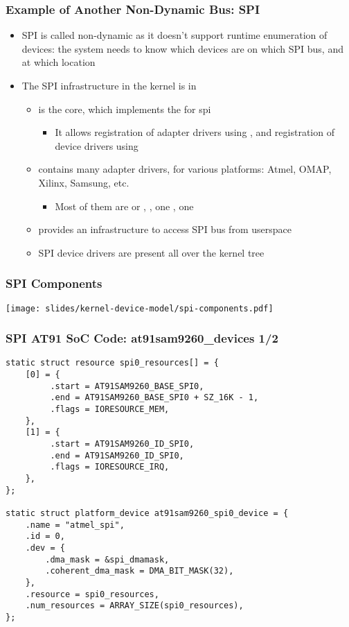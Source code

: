 \begin{frame}
  \frametitle{Example of Another Non-Dynamic Bus: SPI}
  \begin{itemize}
  \item SPI is called non-dynamic as it doesn't support runtime
    enumeration of devices: the system needs to know which devices are
    on which SPI bus, and at which location
  \item The SPI infrastructure in the kernel is in 
    \begin{itemize}
    \item {} is the core, which implements the
       for spi
      \begin{itemize}
      \item It allows registration of adapter drivers using
        , and registration of device
        drivers using 
      \end{itemize}
    \item {} contains many adapter drivers, for
      various platforms: Atmel, OMAP, Xilinx, Samsung, etc.
      \begin{itemize}
      \item Most of them are  or
        , , one
        , one 
      \end{itemize}
    \item {} provides an infrastructure to
      access SPI bus from userspace
    \item SPI device drivers are present all over the kernel tree
    \end{itemize}
  \end{itemize}
\end{frame}

\begin{frame}
  \frametitle{SPI Components}
  \begin{center}
    \texttt{[image: slides/kernel-device-model/spi-components.pdf]}
  \end{center}
\end{frame}

\begin{frame}[fragile]
  \frametitle{SPI AT91 SoC Code: at91sam9260\_devices 1/2}
  \begin{verbatim}
static struct resource spi0_resources[] = {
    [0] = {
         .start = AT91SAM9260_BASE_SPI0,
         .end = AT91SAM9260_BASE_SPI0 + SZ_16K - 1,
         .flags = IORESOURCE_MEM,
    },
    [1] = {
         .start = AT91SAM9260_ID_SPI0,
         .end = AT91SAM9260_ID_SPI0,
         .flags = IORESOURCE_IRQ,
    },
};

static struct platform_device at91sam9260_spi0_device = {
    .name = "atmel_spi",
    .id = 0,
    .dev = {
        .dma_mask = &spi_dmamask,
        .coherent_dma_mask = DMA_BIT_MASK(32),
    },
    .resource = spi0_resources,
    .num_resources = ARRAY_SIZE(spi0_resources),
};
  \end{verbatim}
\end{frame}

